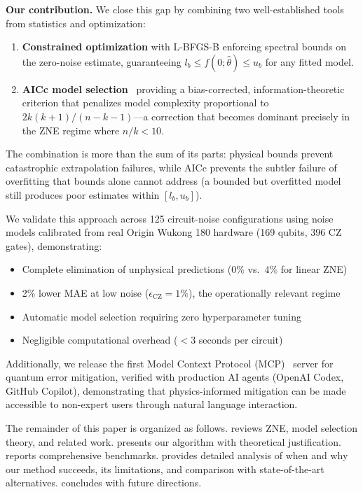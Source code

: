 \textbf{Our contribution.} We close this gap by combining two well-established tools from statistics and optimization:
\begin{enumerate}
    \item \textbf{Constrained optimization} with L-BFGS-B enforcing spectral bounds on the zero-noise estimate, guaranteeing $l_b \leq f(0;\hat\theta) \leq u_b$ for any fitted model.
    \item \textbf{AICc model selection}~\cite{Akaike1974, Hurvich1989, Burnham2002} providing a bias-corrected, information-theoretic criterion that penalizes model complexity proportional to $2k(k+1)/(n-k-1)$---a correction that becomes dominant precisely in the ZNE regime where $n/k < 10$.
\end{enumerate}

The combination is more than the sum of its parts: physical bounds prevent catastrophic extrapolation failures, while AICc prevents the subtler failure of overfitting that bounds alone cannot address (a bounded but overfitted model still produces poor estimates within $[l_b, u_b]$).

We validate this approach across 125 circuit-noise configurations using noise models calibrated from real Origin Wukong 180 hardware (169 qubits, 396 CZ gates), demonstrating:
\begin{itemize}
    \item Complete elimination of unphysical predictions (0\% vs.\ 4\% for linear ZNE)
    \item 2\% lower MAE at low noise ($\epsilon_\text{CZ} = 1\%$), the operationally relevant regime
    \item Automatic model selection requiring zero hyperparameter tuning
    \item Negligible computational overhead ($<$3 seconds per circuit)
\end{itemize}

Additionally, we release the first Model Context Protocol (MCP)~\cite{Anthropic2024} server for quantum error mitigation, verified with production AI agents (OpenAI Codex, GitHub Copilot), demonstrating that physics-informed mitigation can be made accessible to non-expert users through natural language interaction.

The remainder of this paper is organized as follows.  reviews ZNE, model selection theory, and related work.  presents our algorithm with theoretical justification.  reports comprehensive benchmarks.  provides detailed analysis of when and why our method succeeds, its limitations, and comparison with state-of-the-art alternatives.  concludes with future directions.
